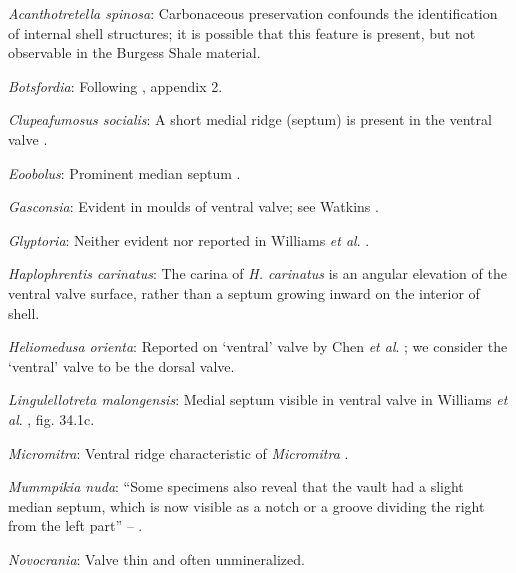 \documentclass[openany]{book}
\theoremstyle{definition}
\theoremstyle{definition}
\theoremstyle{definition}
\theoremstyle{remark}
\begin{document}
\hypertarget{Acanthotretella_spinosa-coding-50}{}
\emph{Acanthotretella spinosa}: Carbonaceous preservation confounds the
identification of internal shell structures; it is possible that this
feature is present, but not observable in the Burgess Shale material.

\hypertarget{Botsfordia-coding-50}{}
\emph{Botsfordia}: Following \citet{Williams1998Thediversity}, appendix
2.

\hypertarget{Clupeafumosus_socialis-coding-50}{}
\emph{Clupeafumosus socialis}: A short medial ridge (septum) is present
in the ventral valve \citep{Topper2013Reappraisalof}.

\hypertarget{Eoobolus-coding-50}{}
\emph{Eoobolus}: Prominent median septum \citep[fig. 4d, e
in][]{Balthasar2009Thebrachiopod}.

\hypertarget{Gasconsia-coding-50}{}
\emph{Gasconsia}: Evident in moulds of ventral valve; see Watkins
\citeyearpar{Watkins2002Newrecord}.

\hypertarget{Glyptoria-coding-50}{}
\emph{Glyptoria}: Neither evident nor reported in Williams \emph{et al}.
\citeyearpar{Williams2000LinguliformeaCraniiformea}.

\hypertarget{Haplophrentis_carinatus-coding-50}{}
\emph{Haplophrentis carinatus}: The carina of \emph{H. carinatus} is an
angular elevation of the ventral valve surface, rather than a septum
growing inward on the interior of shell.

\hypertarget{Heliomedusa_orienta-coding-50}{}
\emph{Heliomedusa orienta}: Reported on `ventral' valve by Chen \emph{et
al}. \citeyearpar{Chen2007Reinterpretationof}; we consider the `ventral'
valve to be the dorsal valve.

\hypertarget{Lingulellotreta_malongensis-coding-50}{}
\emph{Lingulellotreta malongensis}: Medial septum visible in ventral
valve in Williams \emph{et al}.
\citeyearpar{Williams2000LinguliformeaCraniiformea}, fig. 34.1c.

\hypertarget{Micromitra-coding-50}{}
\emph{Micromitra}: Ventral ridge characteristic of \emph{Micromitra}
\citep{Skovsted2010EarlyCambrian}.

\hypertarget{Mummpikia_nuda-coding-50}{}
\emph{Mummpikia nuda}: ``Some specimens also reveal that the vault had a
slight median septum, which is now visible as a notch or a groove
dividing the right from the left part'' --
\citet{Balthasar2008iMummpikia}.

\hypertarget{Novocrania-coding-50}{}
\emph{Novocrania}: Valve thin and often unmineralized.
\end{document}
